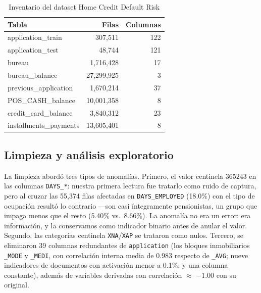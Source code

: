 \documentclass[journal]{IEEEtran}
\begin{document}
\begin{table}[!t]
\caption{Inventario del dataset Home Credit Default Risk}
\label{tab:dataset}
\centering
\small
\begin{tabular}{lrr}
\toprule
Tabla & Filas & Columnas \\
\midrule
application\_train & 307{,}511 & 122 \\
application\_test & 48{,}744 & 121 \\
bureau & 1{,}716{,}428 & 17 \\
bureau\_balance & 27{,}299{,}925 & 3 \\
previous\_application & 1{,}670{,}214 & 37 \\
POS\_CASH\_balance & 10{,}001{,}358 & 8 \\
credit\_card\_balance & 3{,}840{,}312 & 23 \\
installments\_payments & 13{,}605{,}401 & 8 \\
\bottomrule
\end{tabular}
\end{table}

\subsection{Limpieza y análisis exploratorio}

La limpieza abordó tres tipos de anomalías. Primero, el valor centinela $365243$ en las columnas \texttt{DAYS\_*}: nuestra primera lectura fue tratarlo como ruido de captura, pero al cruzar las 55{,}374 filas afectadas en \texttt{DAYS\_EMPLOYED} (18.0\%) con el tipo de ocupación resultó lo contrario ---son casi íntegramente pensionistas, un grupo que impaga menos que el resto (5.40\% vs.\ 8.66\%). La anomalía no era un error: era información, y la conservamos como indicador binario antes de anular el valor. Segundo, las categorías centinela \texttt{XNA}/\texttt{XAP} se trataron como nulos. Tercero, se eliminaron 39 columnas redundantes de \texttt{application} (los bloques inmobiliarios \texttt{\_MODE} y \texttt{\_MEDI}, con correlación interna media de 0.983 respecto de \texttt{\_AVG}; nueve indicadores de documentos con activación menor a 0.1\%; y una columna constante), además de variables derivadas con correlación $\approx$ $-1.00$ con su original.
\end{document}
